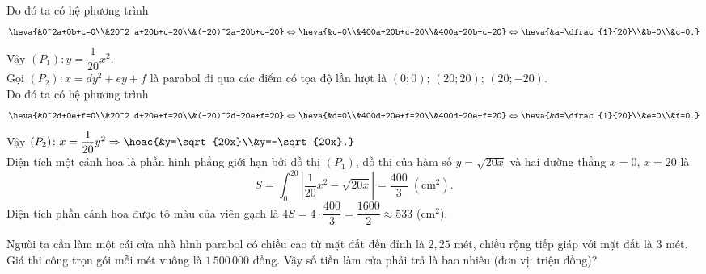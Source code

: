 \begin{bt}
{		Do đó ta có hệ phương  trình
		$$\heva{&0^2a+0b+c=0\\&20^2 a+20b+c=20\\&(-20)^2a-20b+c=20} \Leftrightarrow \heva{&c=0\\&400a+20b+c=20\\&400a-20b+c=20}  \Leftrightarrow \heva{&a=\dfrac{1}{20}\\&b=0\\&c=0.}$$
		Vậy  $(P_1) \colon y=\dfrac{1}{20}x^2$.\\
		Gọi $(P_2) \colon x=dy^2+ey+f$ là parabol đi qua các điểm  có tọa độ lần lượt là $(0;0)$; $(20;20)$; $(20;-20)$.\\
		Do đó ta có hệ phương trình 
		$$\heva{&0^2d+0e+f=0\\&20^2  d+20e+f=20\\&(-20)^2d-20e+f=20} \Leftrightarrow \heva{&d=0\\&400d+20e+f=20\\&400d-20e+f=20} \Leftrightarrow \heva{&d=\dfrac{1}{20}\\&e=0\\&f=0.}$$
		Vậy $(P_2) \colon x=\dfrac{1}{20}y^2 \Rightarrow  \hoac{&y=\sqrt{20x}\\&y=-\sqrt{20x}.}$ \\
		Diện tích một  cánh hoa là phần hình phẳng giới hạn bởi đồ thị $(P_1)$, đồ thị của hàm số $y=\sqrt{20x}$ và hai đường thẳng $x=0$, $x=20$ là
		$$S=\displaystyle \int_{0}^{20} \left| \dfrac{1}{20}x^2-\sqrt{20x}\right|=\dfrac{400}{3} \; (\text{cm}^2).$$ 
		Diện tích phần cánh hoa được tô màu của viên gạch là $4S=4 \cdot \dfrac{400}{3}=\dfrac{1600}{2} \approx  533$ (cm$^2$).
	} 
\end{bt}

\begin{bt}%
	Người ta cần làm một cái cửa nhà hình parabol có chiều cao từ mặt đất đến đỉnh là $2{,}25$ mét, chiều rộng tiếp giáp  với mặt đất là $3$ mét. Giá thi công trọn gói mỗi mét vuông là $1\,500\,000$ đồng. Vậy số tiền làm cửa phải trả là bao nhiêu (đơn vị: triệu đồng)?
\end{bt}

